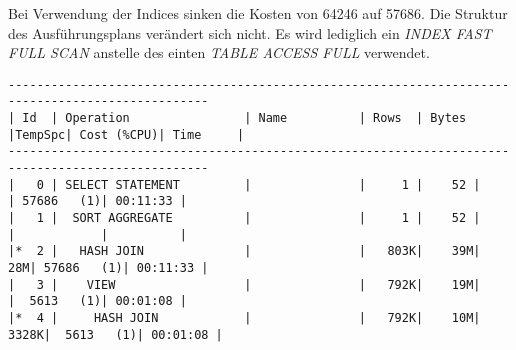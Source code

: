 \documentclass[11pt,a4paper,parskip=half]{scrartcl}
\begin{document}
Bei Verwendung der Indices sinken die Kosten von 64246 auf 57686. Die Struktur des Ausführungsplans verändert sich nicht. Es wird lediglich ein \emph{INDEX FAST FULL SCAN} anstelle des einten \emph{TABLE ACCESS FULL} verwendet. 
\begin{lstlisting}
--------------------------------------------------------------------------------------------------                                                                                                                                                                                                           
| Id  | Operation                | Name          | Rows  | Bytes |TempSpc| Cost (%CPU)| Time     |                                                                                                                                                                                                           
--------------------------------------------------------------------------------------------------                                                                                                                                                                                                           
|   0 | SELECT STATEMENT         |               |     1 |    52 |       | 57686   (1)| 00:11:33 |                                                                                                                                                                                                           
|   1 |  SORT AGGREGATE          |               |     1 |    52 |       |            |          |                                                                                                                                                                                                           
|*  2 |   HASH JOIN              |               |   803K|    39M|    28M| 57686   (1)| 00:11:33 |                                                                                                                                                                                                           
|   3 |    VIEW                  |               |   792K|    19M|       |  5613   (1)| 00:01:08 |                                                                                                                                                                                                           
|*  4 |     HASH JOIN            |               |   792K|    10M|  3328K|  5613   (1)| 00:01:08 |                                                                                                                                                                                                           

\end{lstlisting}
\end{document}
